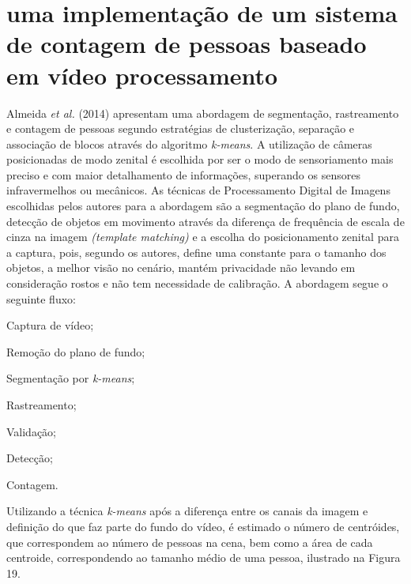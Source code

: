\documentclass[12pt,oneside,a4paper,chapter=TITLE,section=TITLE,sumario=tradicional]{abntex2}
\begin{document}
\section{uma implementação de um sistema de contagem de pessoas baseado em vídeo processamento}
Almeida \textit{et al.} (2014) apresentam uma abordagem de segmentação, rastreamento e contagem de pessoas segundo estratégias de clusterização, separação e associação de blocos através do algoritmo \textit{k-means}. A utilização de câmeras posicionadas de modo zenital é escolhida por ser o modo de sensoriamento mais preciso e com maior detalhamento de informações, superando os sensores infravermelhos ou mecânicos.
As técnicas de Processamento Digital de Imagens escolhidas pelos autores para a abordagem são a segmentação do plano de fundo, detecção de objetos em movimento através da diferença de frequência de escala de cinza na imagem \textit{(template matching)} e a escolha do posicionamento zenital para a captura, pois, segundo os autores, define uma constante para o tamanho dos objetos, a melhor visão no cenário, mantém privacidade não levando em consideração rostos e não tem necessidade de calibração.
A abordagem segue o seguinte fluxo:
\begin{lista}
    \item Captura de vídeo;
    \item Remoção do plano de fundo;
    \item Segmentação por \textit{k-means};
    \item Rastreamento;
    \item Validação;
    \item Detecção;
    \item Contagem.
\end{lista}

Utilizando a técnica \textit{k-means} após a diferença entre os canais da imagem e definição do que faz parte do fundo do vídeo, é estimado o número de centróides, que correspondem ao número de pessoas na cena, bem como a área de cada centroide, correspondendo ao tamanho médio de uma pessoa, ilustrado na Figura 19.

\begin{figure}[htb]
\end{figure}
\end{document}
